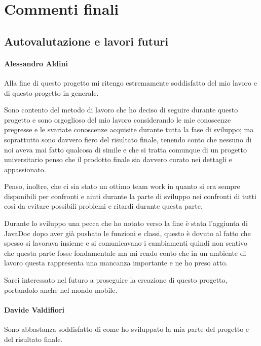 \documentclass[a4paper,12pt]{report}
\begin{document}
    \chapter{Commenti finali}

    \section{Autovalutazione e lavori futuri}

    \subsubsection{Alessandro Aldini}

    Alla fine di questo progetto mi ritengo estremamente soddisfatto del mio lavoro e di questo progetto in generale.

    Sono contento del metodo di lavoro che ho deciso di seguire durante questo progetto e sono orgoglioso del mio lavoro considerando le mie conoscenze pregresse e le svariate conoscenze acquisite durante tutta la fase di sviluppo; ma soprattutto sono davvero fiero del risultato finale, tenendo conto che nessuno di noi aveva mai fatto qualcosa di simile e che si tratta comunque di un progetto universitario penso che il prodotto finale sia davvero curato nei dettagli e appassionato.

    Penso, inoltre, che ci sia stato un ottimo team work in quanto si era sempre disponibili per confronti e aiuti durante la parte di sviluppo nei confronti di tutti così da evitare possibili problemi e ritardi durante questa parte.

    Durante lo sviluppo una pecca che ho notato verso la fine è stata l’aggiunta di JavaDoc dopo aver già pushato le funzioni e classi, questo è dovuto al fatto che spesso si lavorava insieme e si comunicavano i cambiamenti quindi non sentivo che questa parte fosse fondamentale ma mi rendo conto che in un ambiente di lavoro questa rappresenta una mancanza importante e ne ho preso atto.

    Sarei interessato nel futuro a proseguire la creazione di questo progetto, portandolo anche nel mondo mobile.

    \subsubsection{Davide Valdifiori}

    Sono abbastanza soddisfatto di come ho sviluppato la mia parte del progetto e del risultato finale.
\end{document}
